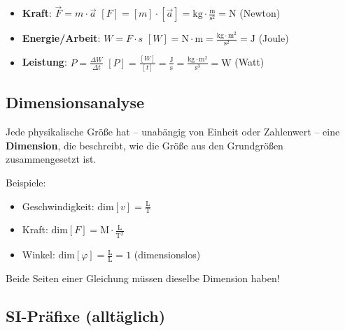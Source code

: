 \documentclass[
  11pt,
]{article}
\providecommand{\tightlist}{%
  \setlength{\itemsep}{0pt}\setlength{\parskip}{0pt}}
\begin{document}
\begin{itemize}
\item
  \textbf{Kraft}: \(\vec{F} = m \cdot \vec{a}\)
  \([F] = [m] \cdot [\vec{a}]= \text{kg} \cdot \frac{\text{m}}{\text{s}^2} = \text{N}\)
  (Newton)
\item
  \textbf{Energie/Arbeit}: \(W = F \cdot s\)
  \([W]  = \text{N} \cdot \text{m} = \frac{\text{kg} \cdot \text{m}^2}{\text{s}^2}= \text{J}\)
  (Joule)
\item
  \textbf{Leistung}: \(P = \frac{\Delta W}{\Delta t}\)
  \([P]  = \frac{[W]}{[t]} = \frac{\text{J}}{\text{s}} = \frac{\text{kg} \cdot \text{m}^2}{\text{s}^3}= \text{W}\)
  (Watt)
\end{itemize}

\subsection{Dimensionsanalyse}\label{dimensionsanalyse}

Jede physikalische Größe hat -- unabängig von Einheit oder Zahlenwert --
eine \textbf{Dimension}, die beschreibt, wie die Größe aus den
Grundgrößen zusammengesetzt ist.

Beispiele:

\begin{itemize}
\tightlist
\item
  Geschwindigkeit: \(\text{dim}[v] = \frac{\text{L}}{\text{T}}\)
\item
  Kraft: \(\text{dim}[F] = \text{M} \cdot \frac{\text{L}}{\text{T}^2}\)
\item
  Winkel: \(\text{dim}[\varphi] = \frac{\text{L}}{\text{L}} = 1\)
  (dimensionslos)
\end{itemize}

Beide Seiten einer Gleichung müssen dieselbe Dimension haben!

\subsection{SI-Präfixe (alltäglich)}\label{si-pruxe4fixe-alltuxe4glich}
\end{document}
